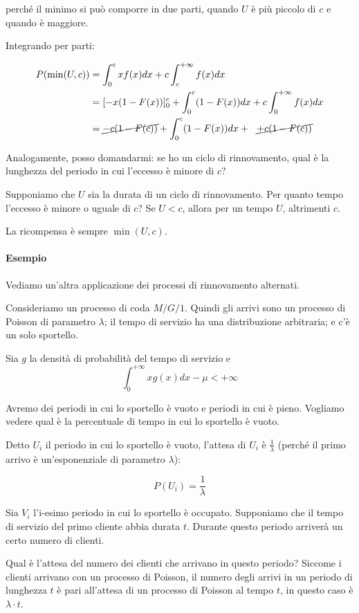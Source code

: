 \documentclass[a4paper,12pt]{book}
\begin{document}
perché il minimo si può comporre in due parti, quando $ U $ è più piccolo di $ c $ e quando è maggiore. 

Integrando per parti:

\begin{align*}
	P(\min(U,c)) & = \int_{0}^{c} xf(x)dx + c\int_{c}^{+\infty} f(x) dx \\
	& = [ -x(1 - F(x)) ]_0^c + \int_{0}^{c}(1 - F(x))dx + c\int_{0}^{+\infty} f(x)dx \\
	& = \cancel{- c (1 - F(c))} + \int_{0}^{c}(1 - F(x))dx + \ \ \cancel{+ c(1-F(c))} 
\end{align*}

Analogamente, posso domandarmi: se ho un ciclo di rinnovamento, qual è la lunghezza del periodo in cui l'eccesso  è minore di $ c $?

Supponiamo che $ U $ sia la durata di un ciclo di rinnovamento. Per quanto tempo l'eccesso è minore o uguale di $ c $? Se $ U < c $, allora per un tempo $ U $, altrimenti $ c $.

La ricompensa è sempre $ \min(U, c) $.

\paragraph{Esempio} 
Vediamo un'altra applicazione dei processi di rinnovamento alternati.

Consideriamo un processo di coda $ M/G/1 $. 
Quindi gli arrivi sono un processo di Poisson di parametro $\lambda$; il tempo di servizio ha una distribuzione arbitraria; e c'è un solo sportello. 

Sia $ g $ la densità di probabilità del tempo di servizio e 
$$ \int_{0}^{+\infty} x g(x) dx - \mu < +\infty $$ 

Avremo dei periodi in cui lo sportello è vuoto e periodi in cui è pieno. Vogliamo vedere qual è la percentuale di tempo in cui lo sportello è vuoto.

Detto $ U_i $ il periodo in cui lo sportello è vuoto, l'attesa di $ U_i $ è $\frac{1}{\lambda}$ (perché il primo arrivo è un'esponenziale di parametro $\lambda$):

$$ P(U_i) = \frac{1}{\lambda} $$

Sia $ V_i $ l'i-esimo periodo in cui lo sportello è occupato. Supponiamo che il tempo di servizio del primo cliente abbia durata $ t $. Durante questo periodo arriverà un certo numero di clienti.

Qual è l'attesa del numero dei clienti che arrivano in questo periodo? Siccome i clienti arrivano con un processo di Poisson, il numero degli arrivi in un periodo di lunghezza $ t $ è pari all'attesa di un processo di Poisson al tempo $ t $, in questo caso è $\lambda\cdot t$.  
\end{document}
